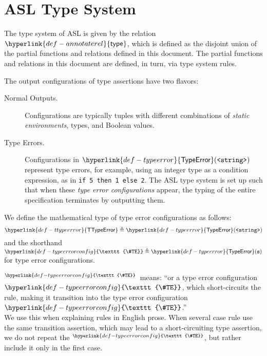 \documentclass{book}
\newcommand\TypeError[0]{\hyperlink{def-typeerror}{\textsf{TypeError}}}
\newcommand\TTypeError[0]{\hyperlink{def-ttypeerror}{\textsf{TTypeError}}}
\newcommand\TypeErrorConfig[0]{\hyperlink{def-typeerrorconfig}{\texttt{\#TE}}}
\newcommand\ProseOrTypeError[0]{\hyperlink{def-proseortypeerror}{$^{\TypeErrorConfig}$}}
\newcommand\annotaterel[0]{\hyperlink{def-annotaterel}{\textsf{type}}}
\newcommand\annotatestmt[1]{\texttt{annotate\_stmt}(#1)}
\newcommand\tenvone[0]{\texttt{tenv1}}
\newcommand\tenvtwo[0]{\texttt{tenv2}}
\newcommand\vs[0]{\texttt{s}}
\newcommand\vsone[0]{\texttt{s1}}
\newcommand\vstwo[0]{\texttt{s2}}
\newcommand\newsone[0]{\texttt{new\_s1}}
\newcommand\newstwo[0]{\texttt{new\_s2}}
\begin{document}
\section{ASL Type System}
\hypertarget{def-annotaterel}{}
The type system of ASL is given by the relation $\annotaterel$, which is defined as the disjoint union
of the partial functions and relations defined in this document.
The partial functions and relations in this document are defined, in turn, via type system rules.

The output configurations of type assertions have two flavors:
\begin{description}
  \item[Normal Outputs.] \hypertarget{def-normal-type-outputs}{}
  Configurations are typically tuples with different combinations
  of \emph{static environments}, types, and Boolean values.

  \hypertarget{def-typeerror}{}
  \item[Type Errors.] Configurations in $\TypeError(\texttt{<string>})$
  represent type errors, for example, using an integer type as a condition expression, as in \verb|if 5 then 1 else 2|.
  The ASL type system is set up such that when these \emph{type error configurations} appear,
  the typing of the entire specification terminates by outputting them.
\end{description}

We define the mathematical type of type error configurations as follows:
\hypertarget{def-ttypeerror}{}
\[
  \TTypeError \triangleq \TypeError(\texttt{<string>})
\]
\hypertarget{def-typeerrorconfig}{}
and the shorthand $\TypeErrorConfig \triangleq \TypeError(\vs)$ for type error configurations.

\hypertarget{def-proseortypeerror}{}
\ProseOrTypeError\ means: ``or a type error configuration $\TypeErrorConfig$, which short-circuits the rule,
making it transition into the type error configuration $\TypeErrorConfig$.''\\
We use this when explaining rules in English prose.
%
When several case rule use the same transition assertion, which may lead to a short-circuiting
type assertion, we do not repeat the \ProseOrTypeError, but rather include it only in the first case.

\end{document}
